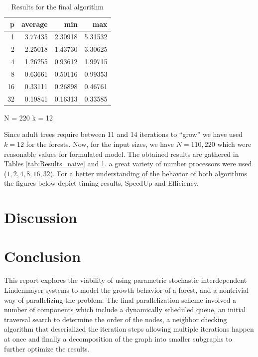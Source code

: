 \documentclass[letterpaper,twoside,11pt]{article}
\begin{document}
\begin{multicols}{2}
\begin{table}[H]
    \begin{subtable}{.5\textwidth}
      \centering
        \begin{tabular}{*{4}{r}}
        \textbf{p} &   \textbf{average} &       \textbf{min} &       \textbf{max} \\
            \midrule
            1 & 3.77435 & 2.30918 & 5.31532\\
            2 & 2.25018 & 1.43730 & 3.30625\\
            4 & 1.26255 & 0.93612 & 1.99715\\
            8 & 0.63661 & 0.50116 & 0.99353\\
            16 & 0.33111 & 0.26898 & 0.46761\\
            32 & 0.19841 & 0.16313 & 0.33585\\
        \end{tabular}
        \caption{N = 220 k = 12}
        \label{tab:Results_final220}
    \end{subtable}%
    \caption{Results for the final algorithm}
    \label{tab:Results_final}
\end{table}

Since adult trees require between 11 and 14 iterations to ``grow'' we have used $k = 12$ for the forests. Now, for the input sizes, we have $N = 110, 220$ which were reasonable values for formulated model. The obtained results are gathered in Tables \ref{tab:Results_naive} and \ref{tab:Results_final}. a great variety of number processors were used ($1, 2, 4, 8, 16, 32$). For a better understanding of the behavior of both algorithms the figures below depict timing results, SpeedUp and Efficiency.



\section{Discussion} %
\label{sec:discussion}




\section{Conclusion} %
\label{sec:conclusion}

This report explores the viability of using parametric stochastic interdependent Lindenmayer systems to model the growth behavior of a forest, and a nontrivial way of parallelizing the problem. The final parallelization scheme involved a number of components which include a dynamically scheduled queue, an initial traversal search to determine the order of the nodes, a neighbor checking algorithm that deserialized the iteration steps allowing multiple iterations happen at once and finally a decomposition of the graph into smaller subgraphs to further optimize the results.


\end{multicols}
\end{document}
